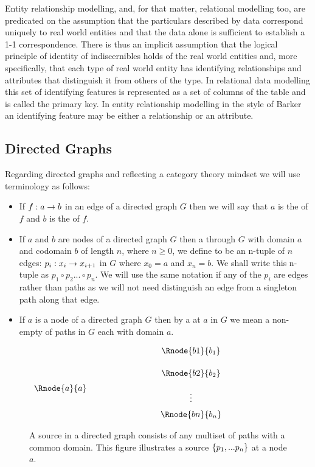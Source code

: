 Entity relationship modelling, and, for that matter, relational modelling too, are predicated on the assumption that the particulars described by data correspond uniquely to real world entities and that the data alone is sufficient to establish a 1-1 correspondence. There is thus an implicit assumption that the logical principle of identity of indiscernibles holds of the real world entities and, more specifically, that each type of real world entity has identifying relationships and attributes that distinguish it from  others of the type. In relational data modelling this set of identifying features is represented as a set of columns of the table and is called the primary key. In entity relationship modelling in the style of Barker an identifying feature may be either a relationship or an attribute.   


\subsection{Directed Graphs}
Regarding directed graphs and reflecting a category theory mindset we will use terminology as follows:
\begin{itemize}
\item
 If $f: a \rightarrow b$ in an edge of a directed graph $G$ then we will say that $a$ is the  of $f$ and $b$ is the  of $f$.
\item
If $a$ and $b$ are nodes of a directed graph $G$ then a  through $G$ with domain $a$ and 
codomain $b$ of length $n$, where $n \geq 0$, we define to be  an n-tuple of  $n$ edges: $p_i: x_i \rightarrow x_{i+1} $ in $G$ where $x_0=a$ and $x_n=b$. We shall write this n-tuple as $p_1 \circ p_2... \circ p_n$. 
We will use the same notation if any of the $p_i$ are edges rather than paths as we will not need distinguish  an edge from a singleton path along that edge. 
\item
If $a$ is a node of a directed graph $G$ then by a  at $a$ in $G$ we mean a non-empty  of paths in $G$ each with domain $a$.
\end{itemize}
\begin{figure}
\setlength{\arraycolsep}{.2cm}
\begin{center}
$
\begin{array}{cp{2cm}ccp{2cm}c}
             & &         & \Rnode{b1}{b_1} \\ [0.5cm]
						 & &         & \Rnode{b2}{b_2} \\ [0.2cm]
\Rnode{a}{a} & &         &                 \\ [-0.2cm]						
             & &         &    \vdots       \\ [0.2cm]
             & &         & \Rnode{bn}{b_n} \\ 
\end{array}
$
\end{center}
\caption{A source in a directed graph consists of any multiset of paths with a common domain. This figure illustrates a source $\left\{p_1,...p_n\right\}$ at a node $a$.}
\label{sourceillustration}
\end{figure}


